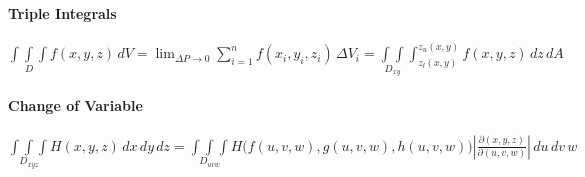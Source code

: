 \documentclass[10pt,letter]{article}
\theoremstyle{plain}
\theoremstyle{definition}
\begin{document}
\paragraph{Triple Integrals}$\underset{D}{\int\int\int}f(x,y,z)\,dV=\lim_{\Delta P\rightarrow0}\sum_{i=1}^nf(x_i,y_i,z_i)\,\Delta V_i=\underset{D_{xy}}{\int\int}\int_{z_l(x,y)}^{z_u(x,y)}f(x,y,z)\,dz\,dA$ 
\paragraph{Change of Variable}$\underset{D_{xyz}}{\int\int\int}H(x,y,z)\,dx\,dy\,dz=\underset{D_{uvw}}{\int\int\int}H\big(f(u,v,w),g(u,v,w),h(u,v,w)\big)\left|\frac{\partial(x,y,z)}{\partial(u,v,w)}\right|\,du\,dv\,w$
\end{document}
